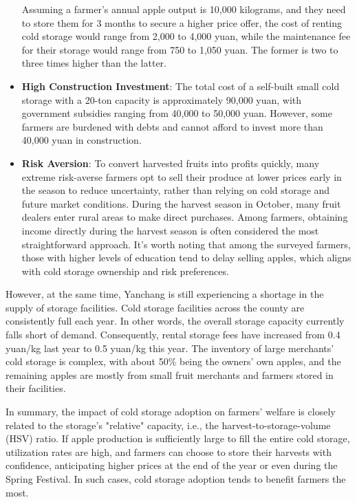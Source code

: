 \documentclass[12pt]{article}
\begin{document}
\begin{itemize}
    Assuming a farmer's annual apple output is 10,000 kilograms, and they need to store them for 3 months to secure a higher price offer, the cost of renting cold storage would range from 2,000 to 4,000 yuan, while the maintenance fee for their storage would range from 750 to 1,050 yuan. The former is two to three times higher than the latter.

    \item \textbf{High Construction Investment}: The total cost of a self-built small cold storage with a 20-ton capacity is approximately 90,000 yuan, with government subsidies ranging from 40,000 to 50,000 yuan. However, some farmers are burdened with debts and cannot afford to invest more than 40,000 yuan in construction.

    \item \textbf{Risk Aversion}: To convert harvested fruits into profits quickly, many extreme risk-averse farmers opt to sell their produce at lower prices early in the season to reduce uncertainty, rather than relying on cold storage and future market conditions. During the harvest season in October, many fruit dealers enter rural areas to make direct purchases. Among farmers, obtaining income directly during the harvest season is often considered the most straightforward approach. It's worth noting that among the surveyed farmers, those with higher levels of education tend to delay selling apples, which aligns with cold storage ownership and risk preferences.
\end{itemize}

However, at the same time, Yanchang is still experiencing a shortage in the supply of storage facilities. Cold storage facilities across the county are consistently full each year. In other words, the overall storage capacity currently falls short of demand. Consequently, rental storage fees have increased from 0.4 yuan/kg last year to 0.5 yuan/kg this year. The inventory of large merchants' cold storage is complex, with about 50\% being the owners' own apples, and the remaining apples are mostly from small fruit merchants and farmers stored in their facilities.

In summary, the impact of cold storage adoption on farmers' welfare is closely related to the storage's "relative" capacity, i.e., the harvest-to-storage-volume (HSV) ratio. If apple production is sufficiently large to fill the entire cold storage, utilization rates are high, and farmers can choose to store their harvests with confidence, anticipating higher prices at the end of the year or even during the Spring Festival. In such cases, cold storage adoption tends to benefit farmers the most.
\end{document}
